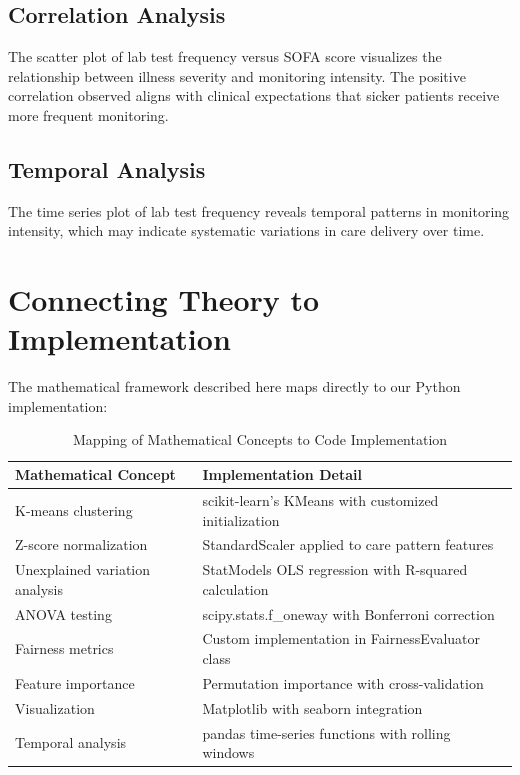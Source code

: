 \documentclass[12pt]{article}
\begin{document}
\subsection{Correlation Analysis}

The scatter plot of lab test frequency versus SOFA score visualizes the relationship between illness severity and monitoring intensity. The positive correlation observed aligns with clinical expectations that sicker patients receive more frequent monitoring.

\subsection{Temporal Analysis}

The time series plot of lab test frequency reveals temporal patterns in monitoring intensity, which may indicate systematic variations in care delivery over time.

\section{Connecting Theory to Implementation}

The mathematical framework described here maps directly to our Python implementation:

\begin{table}[h]
\centering
\caption{Mapping of Mathematical Concepts to Code Implementation}
\begin{tabular}{p{}p{}}
\toprule
\textbf{Mathematical Concept} & \textbf{Implementation Detail} \\
\midrule
K-means clustering & scikit-learn's KMeans with customized initialization \\
Z-score normalization & StandardScaler applied to care pattern features \\
Unexplained variation analysis & StatModels OLS regression with R-squared calculation \\
ANOVA testing & scipy.stats.f\_oneway with Bonferroni correction \\
Fairness metrics & Custom implementation in FairnessEvaluator class \\
Feature importance & Permutation importance with cross-validation \\
Visualization & Matplotlib with seaborn integration \\
Temporal analysis & pandas time-series functions with rolling windows \\
\bottomrule
\end{tabular}
\end{table}
\end{document}
